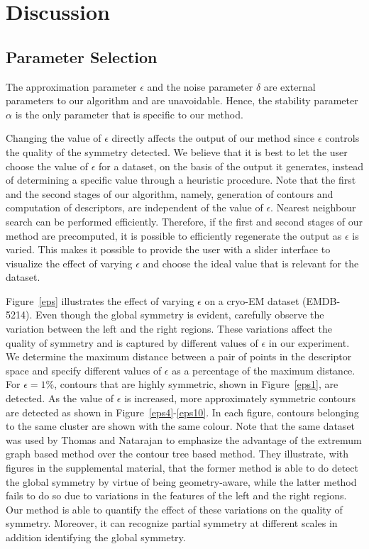 \documentclass[review,journal]{vgtc}         %
\begin{document}
\section{Discussion}
\subsection{Parameter Selection}\label{para}
The approximation parameter $\epsilon$ and the noise parameter $\delta$ are external parameters to our algorithm
and are unavoidable. Hence, the stability parameter $\alpha$ is the only parameter that is specific to our
method.

Changing the value of $\epsilon$ directly affects the output of  our method since $\epsilon$
controls the quality of the symmetry detected. We believe that it is best to let the user choose the value
of $\epsilon$ for a dataset, on the basis of the output it generates, instead of determining a specific
value through a heuristic procedure. Note that the first and the second stages of our algorithm,
namely, generation of contours and computation of descriptors, are independent of the value of 
$\epsilon$. Nearest neighbour search can be performed efficiently. Therefore, if the first and 
second stages of our method are precomputed, it is possible to efficiently regenerate the output
as $\epsilon$ is varied. This makes it possible to provide the user with a slider interface
to visualize the effect of varying $\epsilon$ and choose the ideal value that is relevant
for the dataset.

Figure~\ref{eps} illustrates the effect of varying $\epsilon$ on a cryo-EM dataset (EMDB-5214).
Even though the global symmetry is evident, carefully observe the variation between the left
and the right regions. These variations affect the quality of symmetry and is captured by
different values of $\epsilon$ in our experiment. We determine the maximum distance between a
pair of points in the descriptor space and specify different values of $\epsilon$ as a percentage
of the maximum distance. For $\epsilon=1$\%, contours that are highly symmetric, shown in 
Figure~\ref{eps1}, are detected. As the value of $\epsilon$ is increased, more approximately
symmetric contours are detected as shown in Figure~\ref{eps4}-\ref{eps10}. In each figure,
contours belonging to the same cluster are shown with the same colour.
Note that the same dataset was used by Thomas and Natarajan to emphasize the advantage of
the extremum graph based method over the contour tree based method. They illustrate, 
with figures in the supplemental material, that the former method is able to do detect
the global symmetry by virtue of being geometry-aware, while the latter method fails to
do so due to variations in the features of the left and the right regions. Our method is able
to quantify the effect of these variations on the quality of symmetry. Moreover, it can
recognize partial symmetry at different scales in addition identifying the global symmetry.
\end{document}
